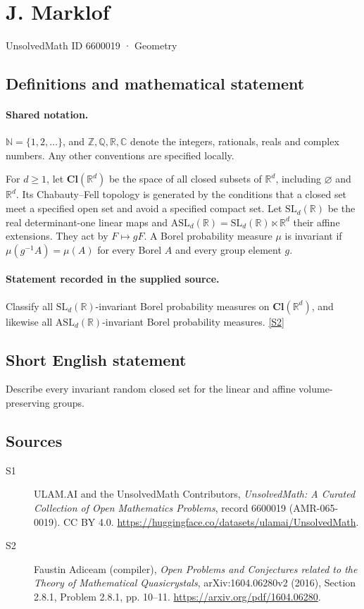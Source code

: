 \documentclass[11pt]{article}
\newcommand{\sref}[2]{\hyperlink{source:#1:#2}{[S#2]}}
\begin{document}
\setcounter{section}{6600018}
\section{J. Marklof}\label{6600019}
{\small\sffamily UnsolvedMath ID 6600019 · Geometry}
\subsection{Definitions and mathematical statement}

\paragraph{Shared notation.}$\mathbb N=\{1,2,\ldots\}$, and $\mathbb Z,\mathbb Q,\mathbb R,\mathbb C$ denote the integers, rationals, reals and complex numbers. Any other conventions are specified locally.


For $d\geq1$, let $\mathbf{Cl}(\mathbb R^d)$ be the space of all closed subsets of $\mathbb R^d$, including $\varnothing$ and $\mathbb R^d$. Its Chabauty--Fell topology is generated by the conditions that a closed set meet a specified open set and avoid a specified compact set. Let $\mathrm{SL}_d(\mathbb R)$ be the real determinant-one linear maps and $\mathrm{ASL}_d(\mathbb R)=\mathrm{SL}_d(\mathbb R)\ltimes\mathbb R^d$ their affine extensions. They act by $F\mapsto gF$. A Borel probability measure $\mu$ is invariant if $\mu(g^{-1}A)=\mu(A)$ for every Borel $A$ and every group element $g$.
\paragraph{Statement recorded in the supplied source.}
Classify all $\mathrm{SL}_d(\mathbb R)$-invariant Borel probability measures on $\mathbf{Cl}(\mathbb R^d)$, and likewise all $\mathrm{ASL}_d(\mathbb R)$-invariant Borel probability measures. \sref{6600019}{2}
\subsection{Short English statement}
Describe every invariant random closed set for the linear and affine volume-preserving groups.
\subsection{Sources}
\begin{description}
\item[\hypertarget{source:6600019:1}{S1}] ULAM.AI and the UnsolvedMath Contributors, \emph{UnsolvedMath: A Curated Collection of Open Mathematics Problems}, record 6600019 (AMR-065-0019). CC BY 4.0. \url{https://huggingface.co/datasets/ulamai/UnsolvedMath}.
\item[\hypertarget{source:6600019:2}{S2}] Faustin Adiceam (compiler), \emph{Open Problems and Conjectures related to the Theory of Mathematical Quasicrystals}, arXiv:1604.06280v2 (2016), Section 2.8.1, Problem 2.8.1, pp. 10--11. \url{https://arxiv.org/pdf/1604.06280}.
\end{description}
\label{end:6600019}
\end{document}
